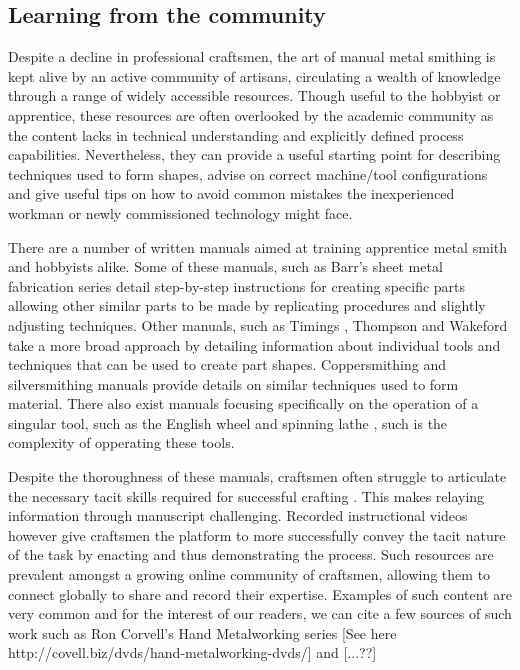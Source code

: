 \subsection{Learning from the community \label{sec:LfC}}
Despite a decline in professional craftsmen, the art of manual metal smithing is kept alive by an active community of artisans, circulating a wealth of knowledge through a range of widely accessible resources. Though useful to the hobbyist or apprentice, these resources are often overlooked by the academic community as the content lacks in technical understanding and explicitly defined process capabilities. Nevertheless, they can provide a useful starting point for describing techniques used to form shapes, advise on correct machine/tool configurations and give useful tips on how to avoid common mistakes the inexperienced workman or newly commissioned technology might face.

There are a number of written manuals aimed at training apprentice metal smith and hobbyists alike. Some of these manuals, such as Barr's sheet metal fabrication series \citep{Barr2013ProfessionalFabrication,Barr2019SheetProjects} detail step-by-step instructions for creating specific parts allowing other similar parts to be made by replicating procedures and slightly adjusting techniques. Other manuals, such as Timings \citep{Timings2008SheetMetalwork}, Thompson \citep{Thompson2007ManufacturingProfessionals} and Wakeford \citep{Wakeford1985SheetWork} take a more broad approach by detailing information about individual tools and techniques that can be used to create part shapes. Coppersmithing \citep{Fuller1904ArtForms} and silversmithing \citep{Hill2014ManufacturingProcesses} manuals provide details on similar techniques used to form material. There also exist manuals focusing specifically on the operation of a singular tool, such as the English wheel \citep{Longyard2014LearningWheel} and spinning lathe \citep{Tuells1912MetalUsed}, such is the complexity of opperating these tools.

Despite the thoroughness of these manuals, craftsmen often struggle to articulate the necessary tacit skills required for successful crafting \citep{Wood2009ACraftsmen}. This makes relaying information through manuscript challenging. Recorded instructional videos however give craftsmen the platform to more successfully convey the tacit nature of the task by enacting and thus demonstrating the process. Such resources are prevalent amongst a growing online community of craftsmen, allowing them to connect globally to share and record their expertise. Examples of such content are very common and for the interest of our readers, we can cite a few sources of such work such as Ron Corvell's Hand Metalworking series [See here http://covell.biz/dvds/hand-metalworking-dvds/]
and [...??]

